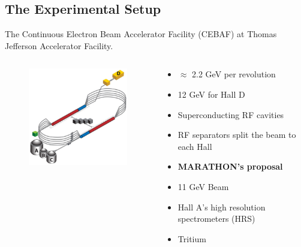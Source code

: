 \documentclass[12pt,usenames,dvipsnames]{beamer}
\begin{document}
\subsection[Equipment]{The Experimental Setup}

\begin{frame}
The Continuous Electron Beam Accelerator Facility (CEBAF) at Thomas Jefferson Accelerator Facility.\\

\vspace{-10pt}
\begin{columns}[c]
		\begin{figure}
			\includegraphics[width=5.5cm]{../images/cebaf.pdf}
		\end{figure}
		\begin{block}{}
			\begin{itemize}
				\addtolength{\itemindent}{-1em}
				\item $\approx$ 2.2 GeV per revolution
				\item 12 GeV for Hall D
				\item Superconducting RF cavities
				\item RF separators split the beam to each Hall
				\item [] \hspace{-15pt}\textbf{MARATHON's proposal }
				\item 11 GeV Beam	
				\item Hall A's high resolution spectrometers (HRS)
				\item Tritium
			\end{itemize}
		\end{block}
\end{columns}
\end{frame}
\end{document}
